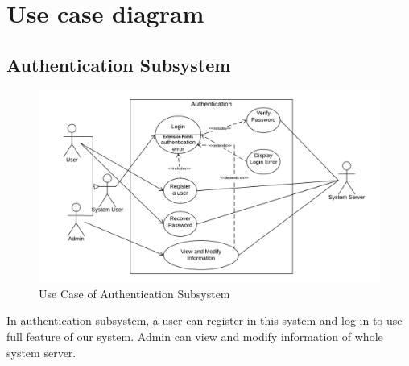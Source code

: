 \documentclass[12pt]{article}
\begin{document}
\section{Use case diagram}


\subsection{Authentication Subsystem}
\begin{figure}[h]
    \centering
    \includegraphics[width=\textwidth]{uclin.png}
    \caption{Use Case of Authentication Subsystem}
    \label{fig:uclin}
\end{figure}

In authentication subsystem, a user can register in this system and log in to use full feature of our system. Admin can view and modify information of whole system server.

\newpage
\end{document}
